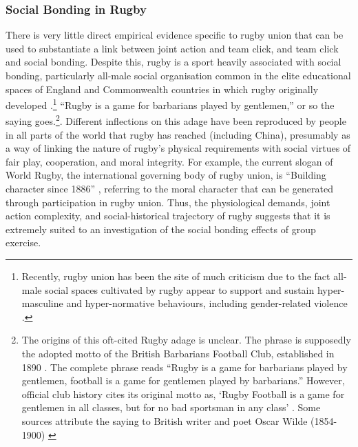 \subsubsection{Social Bonding in Rugby}

  There is very little direct empirical evidence specific to rugby union that can be used to substantiate a link between joint action and team click, and team click and social bonding.  Despite this, rugby is a sport heavily associated with social bonding, particularly all-male social organisation common in the elite educational spaces of England and Commonwealth countries in which rugby originally developed \citep{Dunning2005,Richards2007,Collins2008}.\footnote{Recently, rugby union has been the site of much criticism due to the fact all-male social spaces cultivated by rugby appear to support and sustain hyper-masculine and hyper-normative behaviours, including gender-related violence \citep{Cosslett2014}.
  }   ``Rugby is a game for barbarians played by gentlemen,'' or so the saying goes.\footnote{The origins of this oft-cited Rugby adage is unclear.  The phrase is supposedly the adopted motto of the British Barbarians Football Club, established in 1890 \citep[34]{Dunning2005}.  The complete phrase reads ``Rugby is a game for barbarians played by gentlemen, football is a game for gentlemen played by barbarians.''  However, official club history cites its original motto as, ‘Rugby Football is a game for gentlemen in all classes, but for no bad sportsman in any class' \citep[vii]{Starmer-Smith1977}.  Some sources attribute the saying to British writer and poet Oscar Wilde (1854-1900) \citep{Fleenor2015}}. Different inflections on this adage have been reproduced by people in all parts of the world that rugby has reached (including China), presumably as a way of linking the nature of rugby's physical requirements with social virtues of fair play, cooperation, and moral integrity.
  For example, the current slogan of World Rugby, the international governing body of rugby union, is ``Building character since 1886'' \citep{WorldRugby2017}, referring to the moral character that can be generated through participation in rugby union.  Thus, the physiological demands, joint action complexity, and social-historical trajectory of rugby suggests that it is extremely suited to an investigation of the social bonding effects of group exercise.









